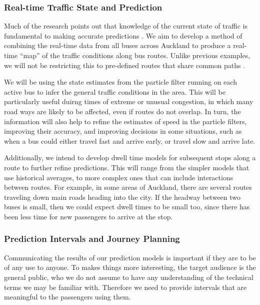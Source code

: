 \documentclass[12pt,a4paper]{article}
\newcommand{\pf}{particle filter}
\begin{document}
\subsubsection*{Real-time Traffic State and Prediction}

Much of the research points out that knowledge of the current state of traffic
is fundamental to making accurate predictions \citep{cn}.
We aim to develop a method of combining the real-time data from
all buses across Auckland
to produce a real-time ``map'' of the traffic conditions along bus routes.
Unlike previous examples,
we will not be restricting this to pre-defined routes that share common paths
\citep{yu-etal:2010}.


We will be using the state estimates from the \pf{} running on each active bus to infer
the general traffic conditions in the area.
This will be particularly useful duirng times of extreme or unusual congestion,
in which many road ways are likely to be affected,
even if routes do not overlap.
In turn, the information will also help to refine the estimates of speed in the \pf{}s,
improving their accuracy,
and improving decisions in some situations,
such as when a bus could either travel fast and arrive early, 
or travel slow and arrive late.


Additionally, we intend to develop dwell time models for subsequent stops along a route
to further refine predictions.
This will range from the simpler models that use historical averages,
to more complex ones that can include interactions between routes.
For example, in some areas of Auckland,
there are several routes traveling down main roads heading into the city.
If the headway between two buses is small,
then we could expect dwell times to be small too, since there has been less time for
new passengers to arrive at the stop.




\subsubsection*{Prediction Intervals and Journey Planning}

Communicating the results of our prediction models is important if they are to be of any use to anyone.
To makes things more interesting, the target audience is the general public,
who we do not assume to have any understanding of the technical terms we may be familiar with.
Therefore we need to provide intervals that are meaningful to the passengers using them.
\end{document}
